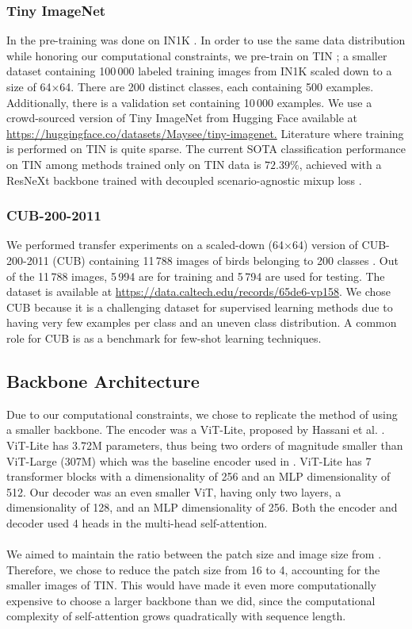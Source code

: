 \subsubsection{Tiny ImageNet} 
In \cite{mae} the pre-training was done on IN1K \cite{in1k}. In order to use the same data distribution while honoring our computational constraints, we pre-train on TIN \cite{tin}; a smaller dataset containing 100\,000 labeled training images from IN1K scaled down to a size of 64$\times$64. There are 200 distinct classes, each containing 500 examples. Additionally, there is a validation set containing 10\,000 examples. We use a crowd-sourced version of Tiny ImageNet from Hugging Face available at \url{https://huggingface.co/datasets/Maysee/tiny-imagenet.} Literature where training is performed on TIN is quite sparse. The current SOTA classification performance on TIN among methods trained only on TIN data is $72.39\%$, achieved with a ResNeXt backbone trained with decoupled scenario-agnostic mixup loss \cite{dm}. 

\subsubsection{CUB-200-2011}
We performed transfer experiments on a scaled-down (64$\times$64) version of CUB-200-2011 (CUB) containing 11\,788 images of birds belonging to 200 classes \cite{cub}. Out of the 11\,788 images, 5\,994 are for training and 5\,794 are used for testing. The dataset is available at \url{https://data.caltech.edu/records/65de6-vp158}. We chose CUB because it is a challenging dataset for supervised learning methods due to having very few examples per class and an uneven class distribution. A common role for CUB is as a benchmark for few-shot learning techniques.


\subsection{Backbone Architecture}
Due to our computational constraints, we chose to replicate the method of \cite{mae} using a smaller backbone. The encoder was a ViT-Lite, proposed by Hassani et al. \cite{hassani}. ViT-Lite has 3.72M parameters, thus being two orders of magnitude smaller than ViT-Large (307M) which was the baseline encoder used in \cite{mae}. ViT-Lite has 7 transformer blocks with a dimensionality of 256 and an MLP dimensionality of 512. Our decoder was an even smaller ViT, having only two layers, a dimensionality of 128, and an MLP dimensionality of 256. Both the encoder and decoder used 4 heads in the multi-head self-attention.
\\\\
We aimed to maintain the ratio between the patch size and image size from \cite{mae}. Therefore, we chose to reduce the patch size from 16 to 4, accounting for the smaller images of TIN. This would have made it even more computationally expensive to choose a larger backbone than we did, since the computational complexity of self-attention grows quadratically with sequence length.


